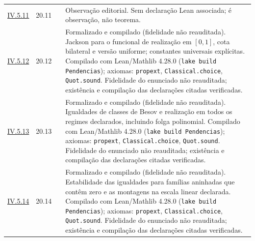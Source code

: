 \begin{longtable}{@{}p{.11\linewidth}p{.09\linewidth}p{.09\linewidth}p{.59\linewidth}@{}}
\hyperref[map:artigo_3:5.11]{IV.5.11} & 20.11 & \pageref{map:artigo_3:5.11} & Observação editorial. Sem declaração Lean associada; é observação, não teorema.\\[4pt]
\hyperref[map:artigo_3:5.12]{IV.5.12} & 20.12 & \pageref{map:artigo_3:5.12} & Formalizado e compilado (fidelidade não reauditada). Jackson para o funcional de realização em $[0,1]$, cota bilateral e versão uniforme; constantes universais explícitas. Compilado com Lean/Mathlib 4.28.0 (\texttt{lake build Pendencias}); axiomas: \texttt{propext}, \texttt{Classical.choice}, \texttt{Quot.sound}. Fidelidade do enunciado não reauditada; existência e compilação das declarações citadas verificadas.\\[4pt]
\hyperref[map:artigo_3:5.13]{IV.5.13} & 20.13 & \pageref{map:artigo_3:5.13} & Formalizado e compilado (fidelidade não reauditada). Igualdades de classes de Besov e realização em todos os regimes declarados, incluindo folga polinomial. Compilado com Lean/Mathlib 4.28.0 (\texttt{lake build Pendencias}); axiomas: \texttt{propext}, \texttt{Classical.choice}, \texttt{Quot.sound}. Fidelidade do enunciado não reauditada; existência e compilação das declarações citadas verificadas.\\[4pt]
\hyperref[map:artigo_3:5.14]{IV.5.14} & 20.14 & \pageref{map:artigo_3:5.14} & Formalizado e compilado (fidelidade não reauditada). Estabilidade das igualdades para famílias aninhadas que contêm zero e as montagens na escala linear declarada. Compilado com Lean/Mathlib 4.28.0 (\texttt{lake build Pendencias}); axiomas: \texttt{propext}, \texttt{Classical.choice}, \texttt{Quot.sound}. Fidelidade do enunciado não reauditada; existência e compilação das declarações citadas verificadas.\\[4pt]
\bottomrule\end{longtable}\normalsize

